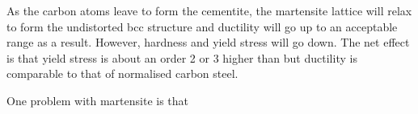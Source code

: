 
As the carbon atoms leave to form the cementite, the martensite lattice will relax to form the undistorted bcc structure and ductility will go up to an acceptable range as a result. However, hardness and yield stress will go down. The net effect is that yield stress is about an order 2 or 3 higher than but ductility is comparable to that of normalised carbon steel.






One problem with martensite is that 


